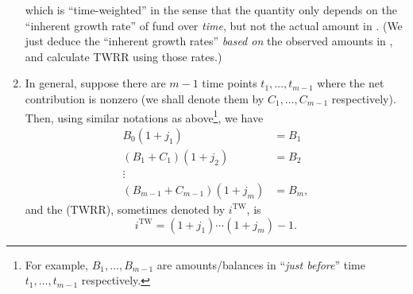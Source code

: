 \begin{enumerate}
\[\]
which is ``time-weighted'' in the sense that the quantity only depends on the
``inherent growth rate'' of fund  over \emph{time}, but not
the actual amount in . (We just deduce the ``inherent growth
rates'' \emph{based on} the observed amounts in , and
calculate TWRR using those rates.)
\item \label{it:twrr-fmla}
In general, suppose there are \(m-1\) time points \(t_1,\dotsc,t_{m-1}\) where
the net contribution is nonzero (we shall denote them by \(C_1,\dotsc,C_{m-1}\)
respectively). Then, using similar notations as above\footnote{For example,
\(B_1,\dotsc,B_{m-1}\) are amounts/balances in  ``\emph{just
before}'' time \(t_1,\dotsc,t_{m-1}\) respectively.}, we have
\begin{align*}
B_0(1+j_1)&=B_1 \\
(B_1+C_1)(1+j_2)&=B_2 \\
\vdots\\
(B_{m-1}+C_{m-1})(1+j_m)&=B_m,
\end{align*}
and the  (TWRR), sometimes denoted by
\(i^{\text{TW}}\),  is
\[
i^{\text{TW}}=\boxed{(1+j_1)\dotsb(1+j_m)-1}.
\]
\end{enumerate}

